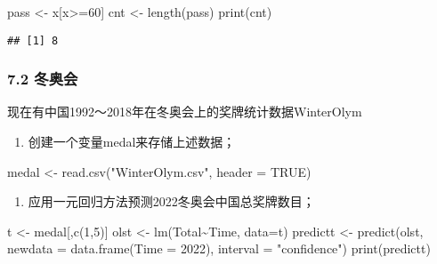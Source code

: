 \documentclass[
]{article}
\newenvironment{Shaded}{\begin{snugshade}}{\end{snugshade}}
\newcommand{\AttributeTok}[1]{\textcolor[rgb]{0.77,0.63,0.00}{#1}}
\newcommand{\ConstantTok}[1]{\textcolor[rgb]{0.00,0.00,0.00}{#1}}
\newcommand{\DecValTok}[1]{\textcolor[rgb]{0.00,0.00,0.81}{#1}}
\newcommand{\FunctionTok}[1]{\textcolor[rgb]{0.00,0.00,0.00}{#1}}
\newcommand{\NormalTok}[1]{#1}
\newcommand{\OtherTok}[1]{\textcolor[rgb]{0.56,0.35,0.01}{#1}}
\newcommand{\SpecialCharTok}[1]{\textcolor[rgb]{0.00,0.00,0.00}{#1}}
\newcommand{\StringTok}[1]{\textcolor[rgb]{0.31,0.60,0.02}{#1}}
\providecommand{\tightlist}{%
  \setlength{\itemsep}{0pt}\setlength{\parskip}{0pt}}
\begin{document}
\begin{Shaded}
\begin{Highlighting}[]
\NormalTok{pass }\OtherTok{\textless{}{-}}\NormalTok{ x[x}\SpecialCharTok{\textgreater{}=}\DecValTok{60}\NormalTok{]}
\NormalTok{cnt }\OtherTok{\textless{}{-}} \FunctionTok{length}\NormalTok{(pass)}
\FunctionTok{print}\NormalTok{(cnt)}
\end{Highlighting}
\end{Shaded}

\begin{verbatim}
## [1] 8
\end{verbatim}

\hypertarget{ux51acux5965ux4f1a}{%
\subsubsection{7.2 冬奥会}\label{ux51acux5965ux4f1a}}

现在有中国1992～2018年在冬奥会上的奖牌统计数据WinterOlym

\begin{enumerate}
\def\labelenumi{\arabic{enumi}.}
\tightlist
\item
  创建一个变量medal来存储上述数据；
\end{enumerate}

\begin{Shaded}
\begin{Highlighting}[]
\NormalTok{medal }\OtherTok{\textless{}{-}}  \FunctionTok{read.csv}\NormalTok{(}\StringTok{"WinterOlym.csv"}\NormalTok{, }\AttributeTok{header =} \ConstantTok{TRUE}\NormalTok{)}
\end{Highlighting}
\end{Shaded}

\begin{enumerate}
\def\labelenumi{\arabic{enumi}.}
\setcounter{enumi}{1}
\tightlist
\item
  应用一元回归方法预测2022冬奥会中国总奖牌数目；
\end{enumerate}

\begin{Shaded}
\begin{Highlighting}[]
\NormalTok{t }\OtherTok{\textless{}{-}}\NormalTok{ medal[,}\FunctionTok{c}\NormalTok{(}\DecValTok{1}\NormalTok{,}\DecValTok{5}\NormalTok{)]}
\NormalTok{olst }\OtherTok{\textless{}{-}} \FunctionTok{lm}\NormalTok{(Total}\SpecialCharTok{\textasciitilde{}}\NormalTok{Time, }\AttributeTok{data=}\NormalTok{t)}
\NormalTok{predictt }\OtherTok{\textless{}{-}} \FunctionTok{predict}\NormalTok{(olst, }\AttributeTok{newdata =} \FunctionTok{data.frame}\NormalTok{(}\AttributeTok{Time =} \DecValTok{2022}\NormalTok{), }\AttributeTok{interval =} \StringTok{"confidence"}\NormalTok{)}
\FunctionTok{print}\NormalTok{(predictt)}
\end{Highlighting}
\end{Shaded}
\end{document}
